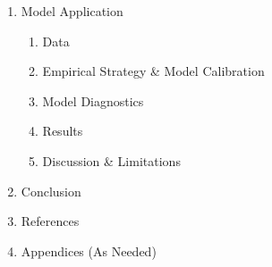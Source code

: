 \documentclass[11pt]{article}
\begin{document}
\begin{enumerate}
	\item Model Application
	\begin{enumerate}
		\item Data
		\item Empirical Strategy \& Model Calibration
		\item Model Diagnostics
		\item Results
		\item Discussion \& Limitations
	\end{enumerate}
	\item Conclusion
	\item References
	\item Appendices (As Needed)
\end{enumerate}


\end{document}
